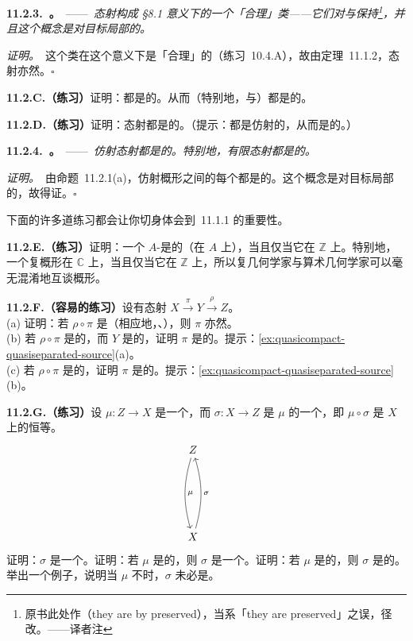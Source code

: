 \textbf{11.2.3.\ \trhProposition{}。}\ ——\ \emph{\trSeparated{}态射构成 \S8.1 意义下的一个「合理」类——它们对\trComposition{}与\trBaseChange{}保持\footnote{原书此处作（they are by preserved），当系「they are preserved」之误，径改。——译者注}，并且这个概念是对目标局部的。}

\emph{证明。}\ \trClosedEmbedding{}这个类在这个意义下是「合理」的（\mbox{练习~10.4.A}），故由定理~11.1.2，\trSeparated{}态射亦然。\hfill$\square$

\textbf{11.2.C.（练习）}\quad 证明：\trMonomorphism{}都是\trSeparated{}的。从而\trLocallyClosedEmbedding（特别地，\trOpenEmbedding{}与\trClosedEmbedding）都是\trSeparated{}的。

\textbf{11.2.D.（练习）}\quad 证明：\trSeparated{}态射都是\trQuasiSeparated{}的。（提示：\trClosedEmbedding{}都是仿射的，从而是\trQuasicompact{}的。）

\textbf{11.2.4.\ \trhProposition{}。}\ ——\ \emph{仿射态射都是\trSeparated{}的。特别地，有限态射都是\trSeparated{}的。}

\emph{证明。}\ 由命题~11.2.1(a)，仿射概形之间的每个\trMorphism{}都是\trSeparated{}的。\trSeparatedness{}这个概念是对目标局部的，故得证。\hfill$\square$

下面的许多道练习都会让你切身体会到\trCancellationTheorem~11.1.1 的重要性。

\textbf{11.2.E.（练习）}\quad 证明：一个 $A$-\trScheme{}是\trSeparated{}的（在 $A$ 上），当且仅当它在 $\mathbb{Z}$ 上\trSeparated。特别地，一个复概形在 $\mathbb{C}$ 上\trSeparated，当且仅当它在 $\mathbb{Z}$ 上\trSeparated，所以复几何学家与算术几何学家可以毫无混淆地互谈\trSeparated{}概形。

\textbf{11.2.F.（容易的练习）}\quad 设有态射 $X\xrightarrow{\ \pi\ }Y\xrightarrow{\ \rho\ }Z$。\\
(a) 证明：若 $\rho\circ\pi$ 是\trLocallyClosedEmbedding（相应地，\trLocally\trFiniteType、\trSeparated），则 $\pi$ 亦然。\\
(b) 若 $\rho\circ\pi$ 是\trQuasicompact{}的，而 $Y$ 是\trNoetherian{}的，证明 $\pi$ 是\trQuasicompact{}的。提示：\cref{ex:quasicompact-quasiseparated-source}(a)。\\
(c) 若 $\rho\circ\pi$ 是\trQuasiSeparated{}的，证明 $\pi$ 是\trQuasiSeparated{}的。提示：\cref{ex:quasicompact-quasiseparated-source}(b)。

\textbf{11.2.G.（练习）}\quad 设 $\mu\colon Z\to X$ 是一个\trMorphism，而 $\sigma\colon X\to Z$ 是 $\mu$ 的一个\trSection，即 $\mu\circ\sigma$ 是 $X$ 上的恒等。
\[
\begin{tikzcd}[row sep=3.2em]
Z \ar[dd, "\mu", bend right=16] \\
& \\
X \ar[uu, "\sigma"', bend right=16]
\end{tikzcd}
\]
证明：$\sigma$ 是一个\trLocallyClosedEmbedding。证明：若 $\mu$ 是\trSeparated{}的，则 $\sigma$ 是一个\trClosedEmbedding。证明：若 $\mu$ 是\trQuasiSeparated{}的，则 $\sigma$ 是\trQuasicompact{}的。举出一个例子，说明当 $\mu$ 不\trSeparated{}时，$\sigma$ 未必是\trClosedEmbedding。

